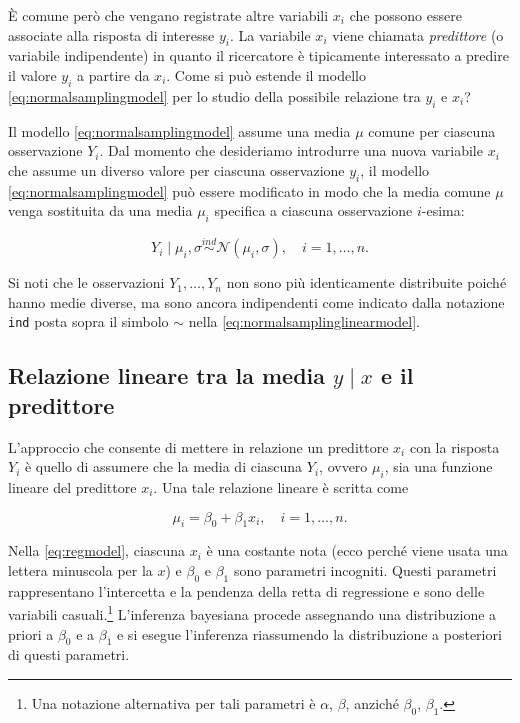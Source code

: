 \documentclass[
  11pt,
]{krantz}
\begin{document}
È comune però che vengano registrate altre variabili \(x_i\) che possono essere associate alla risposta di interesse \(y_i\). La variabile \(x_i\) viene chiamata \emph{predittore} (o variabile indipendente) in quanto il ricercatore è tipicamente interessato a predire il valore \(y_i\) a partire da \(x_i\). Come si può estende il modello \eqref{eq:normalsamplingmodel} per lo studio della possibile relazione tra \(y_i\) e \(x_i\)?

Il modello \eqref{eq:normalsamplingmodel} assume una media \(\mu\) comune per ciascuna osservazione \(Y_i\). Dal momento che desideriamo introdurre una nuova variabile \(x_i\) che assume un diverso valore per ciascuna osservazione \(y_i\), il modello \eqref{eq:normalsamplingmodel} può essere modificato in modo che la media comune \(\mu\) venga sostituita da una media \(\mu_i\) specifica a ciascuna osservazione \(i\)-esima:

\begin{equation}
Y_i \mid \mu_i, \sigma \stackrel{ind}{\sim} \mathcal{N}(\mu_i, \sigma), \quad i = 1, \dots, n.
\label{eq:normalsamplinglinearmodel}
\end{equation}

Si noti che le osservazioni \(Y_1, \dots, Y_n\) non sono più identicamente distribuite poiché hanno medie diverse, ma sono ancora indipendenti come indicato dalla notazione \texttt{ind} posta sopra il simbolo \(\sim\) nella \eqref{eq:normalsamplinglinearmodel}.

\hypertarget{relazione-lineare-tra-la-media-y-mid-x-e-il-predittore}{%
\subsection{\texorpdfstring{Relazione lineare tra la media \(y \mid x\) e il predittore}{Relazione lineare tra la media y \textbackslash mid x e il predittore}}\label{relazione-lineare-tra-la-media-y-mid-x-e-il-predittore}}

L'approccio che consente di mettere in relazione un predittore \(x_i\) con la risposta \(Y_i\) è quello di assumere che la media di ciascuna \(Y_i\), ovvero \(\mu_i\), sia una funzione lineare del predittore \(x_i\). Una tale relazione lineare è scritta come

\begin{equation}
\mu_i = \beta_0 + \beta_ 1 x_i, \quad i = 1, \dots, n.
\label{eq:regmodel}
\end{equation}

Nella \eqref{eq:regmodel}, ciascuna \(x_i\) è una costante nota (ecco perché viene usata una lettera minuscola per la \(x\)) e \(\beta_0\) e \(\beta_ 1\) sono parametri incogniti. Questi parametri rappresentano l'intercetta e la pendenza della retta di regressione e sono delle variabili casuali.\footnote{Una notazione alternativa per tali parametri è \(\alpha\), \(\beta\), anziché \(\beta_0\), \(\beta_ 1\).} L'inferenza bayesiana procede assegnando una distribuzione a priori a \(\beta_0\) e a \(\beta_ 1\) e si esegue l'inferenza riassumendo la distribuzione a posteriori di questi parametri.
\end{document}
